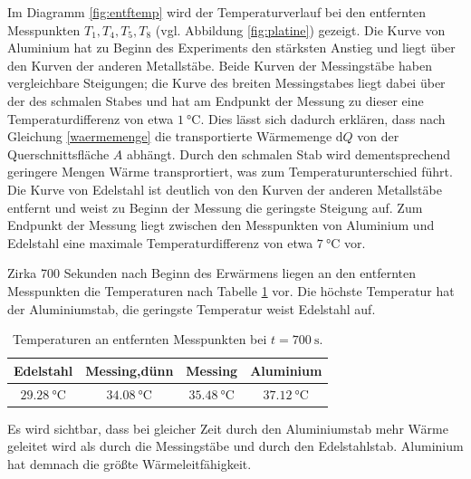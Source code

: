 Im Diagramm \ref{fig:entftemp} wird der Temperaturverlauf bei den entfernten Messpunkten $T_1, T_4, T_5, T_8$ (vgl. Abbildung \ref{fig:platine}) gezeigt. 
Die Kurve von Aluminium hat zu Beginn des Experiments den stärksten Anstieg und liegt über den Kurven der anderen Metallstäbe. 
Beide Kurven der Messingstäbe haben vergleichbare Steigungen;
die Kurve des breiten Messingstabes liegt dabei über der des schmalen Stabes und hat am Endpunkt der Messung zu dieser eine Temperaturdifferenz von etwa $\SI{1}{\degreeCelsius}$.
Dies lässt sich dadurch erklären, dass nach Gleichung \eqref{waermemenge} die transportierte Wärmemenge $\mathup{d}Q$ von der Querschnittsfläche $A$ abhängt.
Durch den schmalen Stab wird dementsprechend geringere Mengen Wärme transprortiert, was zum Temperaturunterschied führt.
Die Kurve von Edelstahl ist deutlich von den Kurven der anderen Metallstäbe entfernt und weist zu Beginn der Messung die geringste Steigung auf. 
Zum Endpunkt der Messung liegt zwischen den Messpunkten von Aluminium und Edelstahl eine maximale Temperaturdifferenz von etwa $\SI{7}{\degreeCelsius}$ vor. 

Zirka 700 Sekunden nach Beginn des Erwärmens liegen an den entfernten Messpunkten die Temperaturen nach Tabelle \ref{tab:700} vor. Die höchste Temperatur hat der Aluminiumstab, die geringste Temperatur weist Edelstahl auf.
\begin{table}
	\centering
	\begin{tabular}{cccc}
	\toprule
	{Edelstahl}&{Messing,dünn}&{Messing}&{Aluminium}\\
	\midrule
	$\SI{29.28}{\degreeCelsius}$& $\SI{34.08}{\degreeCelsius}$& $\SI{35.48}{\degreeCelsius}$& $\SI{37.12}{\degreeCelsius}$\\
	\bottomrule
	\end{tabular}
	\caption{Temperaturen an entfernten Messpunkten bei $t=\SI{700}{\second}$.}
	\label{tab:700}
\end{table}

Es wird sichtbar, dass bei gleicher Zeit durch den Aluminiumstab mehr Wärme geleitet wird als durch die Messingstäbe und durch den Edelstahlstab. 
Aluminium hat demnach die größte Wärmeleitfähigkeit.\\

